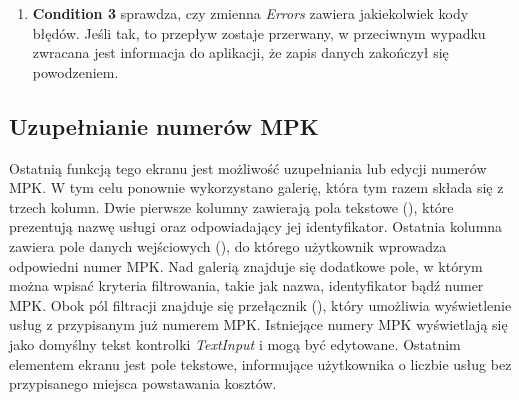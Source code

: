 \begin{enumerate}
\begin{itemize}
              \item \textbf{Filter out null IDs} -- odfiltrowuje elementy, które nie mają przypisanego identyfikatora SharePoint. Gdyby nie ten krok, próba aktualizacji rekordu bez identyfikatora zakończyłaby się błędem.
              \item  \textbf{Replace Template Data} -- wstawia wybrane informacje do szablonu żądania HTTP.
              \item \textbf{batchData} -- w kroku tym znaki specjalne są zakodowane procentowo\footnote{\emph{Kodowanie procentowe} -- metoda reprezentowania znaków specjalnych w adresach URL w formie zgodnej z protokołem HTTP. Polega na zastępowaniu niebezpiecznych lub niedozwolonych znaków ich odpowiednikami w postaci procentowego kodu, który składa się z symbolu "\%" i dwóch cyfr szesnastkowych reprezentujących kod ASCII danego znaku.} (znane również jako \emph{kodowanie URL}). Jest to wymagane, aby uniknąć niepożądanych błędów, związanych ze znakami specjalnymi.
              \item \textbf{Send Batch Request} -- wysyła żądanie aktualizacji danych do SharePoint.
              \item \textbf{Assign result of send batch data to Error var} -- przypisuje odpowiedź serwera na wysłane żądanie w celu późniejszej analizy.
          \end{itemize}

    \item \textbf{Condition 3} sprawdza, czy zmienna \emph{Errors} zawiera jakiekolwiek kody błędów. Jeśli tak, to przepływ zostaje przerwany, w przeciwnym wypadku zwracana jest informacja do aplikacji, że zapis danych zakończył się powodzeniem.
\end{enumerate}

\subsection{Uzupełnianie numerów MPK}
Ostatnią funkcją tego ekranu jest możliwość uzupełniania lub edycji numerów MPK. W tym celu ponownie wykorzystano galerię, która tym razem składa się z trzech kolumn. Dwie pierwsze kolumny zawierają pola tekstowe (), które prezentują nazwę usługi oraz odpowiadający jej identyfikator. Ostatnia kolumna zawiera pole danych wejściowych (), do którego użytkownik wprowadza odpowiedni numer MPK. Nad galerią znajduje się dodatkowe pole, w którym można wpisać kryteria filtrowania, takie jak nazwa, identyfikator bądź numer MPK. Obok pól filtracji znajduje się przełącznik (), który umożliwia wyświetlenie usług z przypisanym już numerem MPK. Istniejące numery MPK wyświetlają się jako domyślny tekst kontrolki \emph{TextInput} i mogą być edytowane. Ostatnim elementem ekranu jest pole tekstowe, informujące użytkownika o liczbie usług bez przypisanego miejsca powstawania kosztów.
